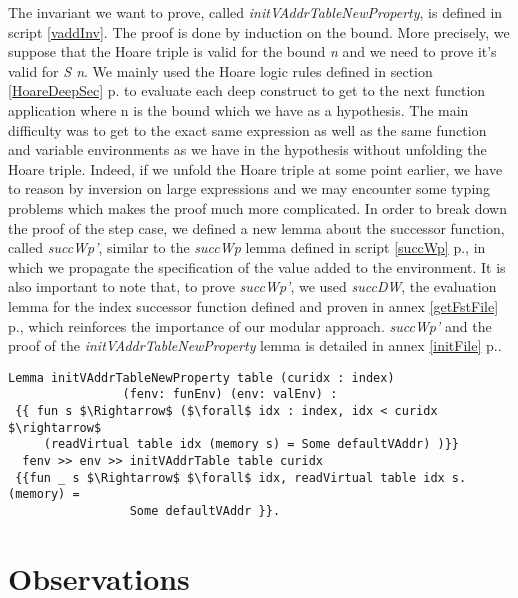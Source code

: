 The invariant we want to prove, called \textit{initVAddrTableNewProperty}, is defined in script \ref{vaddInv}. The proof is done by induction on the bound. More precisely, we suppose that the Hoare triple is valid for the bound \textit{n} and we need to prove it's valid for \textit{S n}. We mainly used the Hoare logic rules defined in section \ref{HoareDeepSec} p.\pageref{HoareDeepSec} to evaluate each deep construct to get to the next function application where n is the bound which we have as a hypothesis. The main difficulty was to get to the exact same expression as well as the same function and variable environments as we have in the hypothesis without unfolding the Hoare triple. Indeed, if we unfold the Hoare triple at some point earlier, we have to reason by inversion on large expressions and we may encounter some typing problems which makes the proof much more complicated. In order to break down the proof of the step case, we defined a new lemma about the successor function, called \textit{succWp'}, similar to the \textit{succWp} lemma defined in script \ref{succWp} p.\pageref{succWp}, in which we propagate the specification of the value added to the environment.  It is also important to note that, to prove \textit{succWp'}, we used \textit{succDW}, the evaluation lemma for the index successor function defined and proven in annex \ref{getFstFile} p.\pageref{getFstFile}, which reinforces the importance of our modular approach. \textit{succWp'} and the proof of the \textit{initVAddrTableNewProperty} lemma is detailed in annex \ref{initFile} p.\pageref{initFile}.
\begin{lstlisting}[caption = {initVAddrTableNewProperty invariant in the deep embedding}, xleftmargin=-.07\textwidth,
xrightmargin=-.07\textwidth,mathescape=true, label={vaddInv}]
Lemma initVAddrTableNewProperty table (curidx : index) 
                (fenv: funEnv) (env: valEnv) :
 {{ fun s $\Rightarrow$ ($\forall$ idx : index, idx < curidx $\rightarrow$ 
     (readVirtual table idx (memory s) = Some defaultVAddr) )}} 
  fenv >> env >> initVAddrTable table curidx 
 {{fun _ s $\Rightarrow$ $\forall$ idx, readVirtual table idx s.(memory) = 
 	             Some defaultVAddr }}. 
\end{lstlisting}	


\section{Observations}

